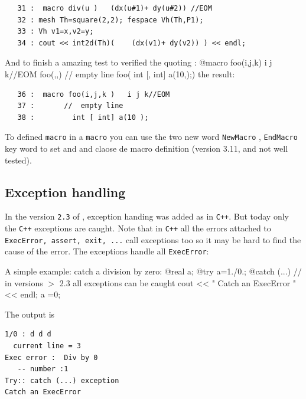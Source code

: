 \documentclass[a4paper,twoside,12pt]{book}
\begin{document}
\begin{verbatim}
   31 :  macro div(u )   (dx(u#1)+ dy(u#2)) //EOM 
   32 : mesh Th=square(2,2); fespace Vh(Th,P1);
   33 : Vh v1=x,v2=y;
   34 : cout << int2d(Th)(    (dx(v1)+ dy(v2)) ) << endl;
\end{verbatim}

And to finish a amazing test to verified the quoting : 
\bFF
@macro foo(i,j,k) i j k//EOM
foo(,,)  //  empty line
foo( {int [}, {int] a(10},{);}) 
\eFF
the result:
\begin{verbatim}
   36 :  macro foo(i,j,k )   i j k//EOM
   37 :       //  empty line
   38 :         int [ int] a(10 ); 

\end{verbatim}

To defined \texttt{macro} in a \texttt{macro} you can use 
the two new word \texttt{NewMacro} , \texttt{EndMacro} key word to set and
and claose de macro definition (version 3.11, and not well tested). 

\subsection{Exception handling}

In the version \texttt{2.3} of \freefempp, exception handing was added as in \texttt{C++}.
But today only the \texttt{C++} exceptions are caught. Note that  in \texttt{C++} all the errors attached to
\texttt{ExecError, assert, exit, ...} call exceptions  too so it may be hard to find the cause of the error.
The exceptions handle all \texttt{ExecError}:



\begin{example} A simple example:    catch a  division by zero:
\bFF
@real a;
@try {
  a=1./0.;
}
@catch  (...) // in versions $>$ 2.3 all exceptions can be caught
{
  cout << " Catch an ExecError " << endl;
  a =0;
}
\eFF
\end{example}

The output is
{\small
\begin{verbatim}
1/0 : d d d
  current line = 3
Exec error :  Div by 0
   -- number :1
Try:: catch (...) exception
Catch an ExecError
\end{verbatim}
}
\end{document}
